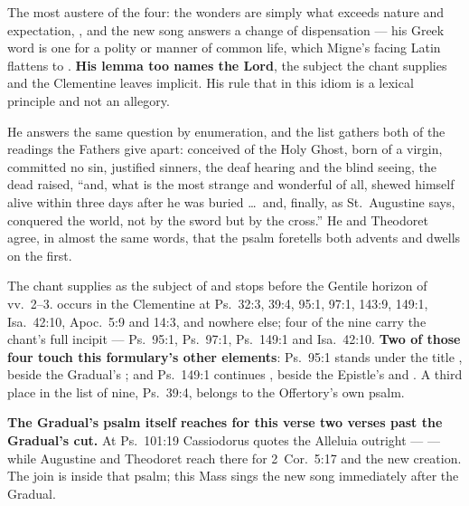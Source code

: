 \begin{witnessnote}
The most austere of the four: the wonders are simply what exceeds nature and
expectation, , and the new song answers a change of
dispensation --- his Greek word is one for a polity or manner of common life,
which Migne's facing Latin flattens to . \textbf{His lemma too
names the Lord}, the subject the chant supplies and the Clementine leaves
implicit. His rule that in this idiom  is a lexical principle and not an allegory.
\end{witnessnote}

\begin{witnessnote}
He answers the same question by enumeration, and the list gathers both of the
readings the Fathers give apart: conceived of the Holy Ghost, born of a virgin,
committed no sin, justified sinners, the deaf hearing and the blind seeing, the
dead raised, ``and, what is the most strange and wonderful of all, shewed himself
alive within three days after he was buried \dots\ and, finally, as St.~Augustine
says, conquered the world, not by the sword but by the cross.'' He and Theodoret
agree, in almost the same words, that the psalm foretells both advents and dwells
on the first.
\end{witnessnote}

The chant supplies  as the subject of  and stops
before the Gentile horizon of vv.~2--3.  occurs in the
Clementine at Ps.~32:3, 39:4, 95:1, 97:1, 143:9, 149:1, Isa.~42:10,
Apoc.~5:9 and 14:3, and nowhere else; four of the nine carry the
chant's full incipit  --- Ps.~95:1,
Ps.~97:1, Ps.~149:1 and Isa.~42:10. \textbf{Two of those four touch
this formulary's other elements}: Ps.~95:1 stands under the title , beside the Gradual's ; and Ps.~149:1 continues ,
beside the Epistle's  and . A third place in the list of nine, Ps.~39:4, belongs to the
Offertory's own psalm.

\textbf{The Gradual's psalm itself reaches for this verse two verses past the
Gradual's cut.} At Ps.~101:19 Cassiodorus quotes the Alleluia outright ---
 --- while Augustine and Theodoret reach
there for 2~Cor.~5:17 and the new creation. The join is inside that psalm; this
Mass sings the new song immediately after the Gradual.

